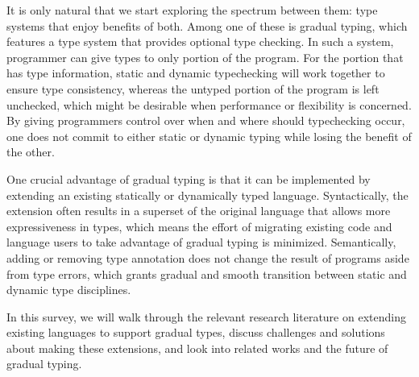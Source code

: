 It is only natural that we start exploring the spectrum between them:
type systems that enjoy benefits of both.
Among one of these is gradual typing, which features a type system
that provides optional type checking.
In such a system, programmer can
give types to only portion of the program.
For the portion that has type information,
static and dynamic typechecking will work together
to ensure type consistency, whereas
the untyped portion of the program is left unchecked,
which might be desirable
when performance or flexibility is concerned.
By giving programmers control over when and where should typechecking
occur, one does not commit to either static or dynamic typing
while losing the benefit of the other.

One crucial advantage of gradual typing is that it can be implemented
by extending an existing statically or dynamically typed language.
Syntactically, the extension often results in a superset of the original
language that allows more expressiveness in types, which means
the effort of migrating existing code and language users
to take advantage of gradual typing is minimized.
Semantically, adding or removing type annotation does not
change the result of programs aside from type errors,
which grants gradual and smooth transition between
static and dynamic type disciplines.

In this survey, we will walk through the relevant research literature on extending
existing languages to support gradual types,
discuss challenges and solutions about making these extensions,
and look into related works and the future of gradual typing.